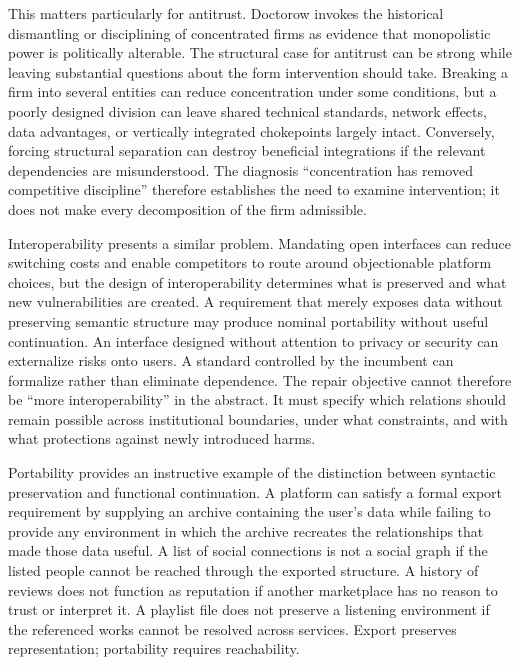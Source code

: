\documentclass[11pt]{article}
\begin{document}
This matters particularly for antitrust. Doctorow invokes the historical dismantling or disciplining of concentrated firms as evidence that monopolistic power is politically alterable. The structural case for antitrust can be strong while leaving substantial questions about the form intervention should take. Breaking a firm into several entities can reduce concentration under some conditions, but a poorly designed division can leave shared technical standards, network effects, data advantages, or vertically integrated chokepoints largely intact. Conversely, forcing structural separation can destroy beneficial integrations if the relevant dependencies are misunderstood. The diagnosis ``concentration has removed competitive discipline'' therefore establishes the need to examine intervention; it does not make every decomposition of the firm admissible.

Interoperability presents a similar problem. Mandating open interfaces can reduce switching costs and enable competitors to route around objectionable platform choices, but the design of interoperability determines what is preserved and what new vulnerabilities are created. A requirement that merely exposes data without preserving semantic structure may produce nominal portability without useful continuation. An interface designed without attention to privacy or security can externalize risks onto users. A standard controlled by the incumbent can formalize rather than eliminate dependence. The repair objective cannot therefore be ``more interoperability'' in the abstract. It must specify which relations should remain possible across institutional boundaries, under what constraints, and with what protections against newly introduced harms.

Portability provides an instructive example of the distinction between syntactic preservation and functional continuation. A platform can satisfy a formal export requirement by supplying an archive containing the user's data while failing to provide any environment in which the archive recreates the relationships that made those data useful. A list of social connections is not a social graph if the listed people cannot be reached through the exported structure. A history of reviews does not function as reputation if another marketplace has no reason to trust or interpret it. A playlist file does not preserve a listening environment if the referenced works cannot be resolved across services. Export preserves representation; portability requires reachability.
\end{document}
